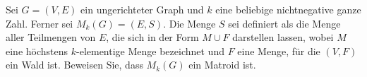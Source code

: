 
\begin{exercise}

Sei $G = (V, E)$ ein ungerichteter Graph und $k$ eine beliebige nichtnegative ganze Zahl.
Ferner sei $M_k(G) = (E, S)$.
Die Menge $S$ sei definiert als die Menge aller Teilmengen von $E$, die sich in der Form $M \cup F$ darstellen lassen, wobei $M$ eine höchstens $k$-elementige Menge bezeichnet und $F$ eine Menge, für die $(V, F)$ ein Wald ist. Beweisen Sie, dass $M_k(G)$ ein Matroid ist.

\end{exercise}


